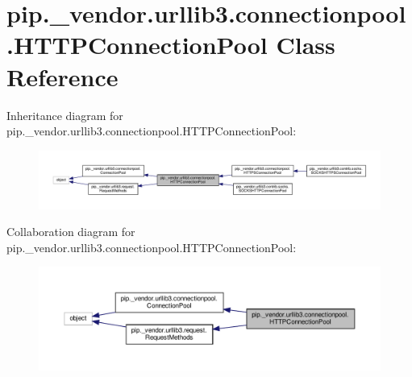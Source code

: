 \hypertarget{classpip_1_1__vendor_1_1urllib3_1_1connectionpool_1_1HTTPConnectionPool}{}\section{pip.\+\_\+vendor.\+urllib3.\+connectionpool.\+H\+T\+T\+P\+Connection\+Pool Class Reference}
\label{classpip_1_1__vendor_1_1urllib3_1_1connectionpool_1_1HTTPConnectionPool}


Inheritance diagram for pip.\+\_\+vendor.\+urllib3.\+connectionpool.\+H\+T\+T\+P\+Connection\+Pool\+:
\nopagebreak
\begin{figure}[H]
\begin{center}
\leavevmode
\includegraphics[width=350pt]{classpip_1_1__vendor_1_1urllib3_1_1connectionpool_1_1HTTPConnectionPool__inherit__graph}
\end{center}
\end{figure}


Collaboration diagram for pip.\+\_\+vendor.\+urllib3.\+connectionpool.\+H\+T\+T\+P\+Connection\+Pool\+:
\nopagebreak
\begin{figure}[H]
\begin{center}
\leavevmode
\includegraphics[width=350pt]{classpip_1_1__vendor_1_1urllib3_1_1connectionpool_1_1HTTPConnectionPool__coll__graph}
\end{center}
\end{figure}
